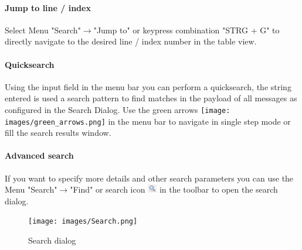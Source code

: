 \documentclass[a4paper,11pt]{article}
\begin{document}
\paragraph{Jump to line / index}
Select Menu "Search"\ensuremath{\rightarrow}"Jump to" or keypress combination "STRG + G" to directly navigate to the desired line / index number in the table view.

\paragraph{Quicksearch}
Using the input field in the menu bar you can perform a quicksearch, the string entered is used a search pattern to find matches in the payload of all messages as configured in the Search Dialog. Use the 
green arrows \texttt{[image: images/green\_arrows.png]} in the menu bar to navigate in single step mode or fill the search results window.

\paragraph{Advanced search}
If you want to specify more details and other search parameters you can use the Menu "Search"\ensuremath{\rightarrow}"Find" or
search icon \includegraphics[width=0.03\textwidth]{images/searchicon.png} in the toolbar to open the search dialog.

\begin{figure}[H]
 \centering
  \texttt{[image: images/Search.png]}
 \caption{Search dialog}
 \label{fig:searchdialog}
\end{figure}
\end{document}

